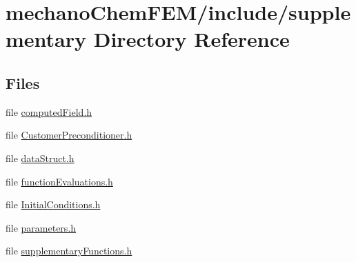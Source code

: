 \section{mechano\+Chem\+F\+E\+M/include/supplementary Directory Reference}
\label{dir_4f8747bbf109c66729f4d31acb1f13e9}
\subsection*{Files}
\begin{DoxyCompactItemize}
\item 
file \mbox{\hyperlink{computed_field_8h}{computed\+Field.\+h}}
\item 
file \mbox{\hyperlink{_customer_preconditioner_8h}{Customer\+Preconditioner.\+h}}
\item 
file \mbox{\hyperlink{data_struct_8h}{data\+Struct.\+h}}
\item 
file \mbox{\hyperlink{function_evaluations_8h}{function\+Evaluations.\+h}}
\item 
file \mbox{\hyperlink{_initial_conditions_8h}{Initial\+Conditions.\+h}}
\item 
file \mbox{\hyperlink{parameters_8h}{parameters.\+h}}
\item 
file \mbox{\hyperlink{supplementary_functions_8h}{supplementary\+Functions.\+h}}
\end{DoxyCompactItemize}
